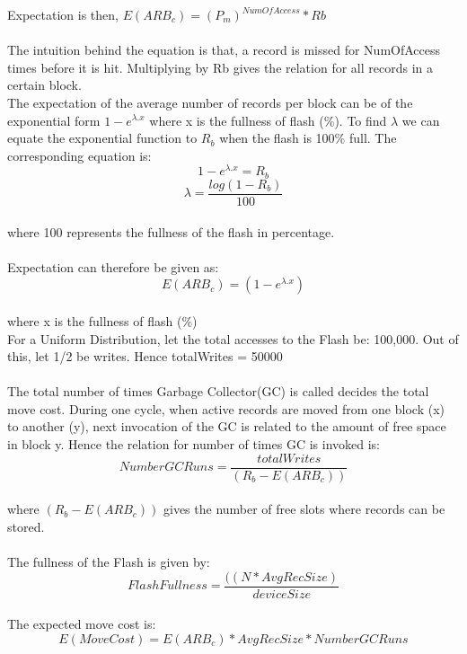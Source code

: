 Expectation is then, $E(ARB_c) = (P_m)^{NumOfAccess} * Rb$\\
\\
The intuition behind the equation is that, a record is missed for NumOfAccess times before it is hit. Multiplying by Rb gives the relation for all records in a certain block.\\


The expectation of the average number of records per block can be of the exponential form $1-e^{\lambda . x}$ where x is the fullness of flash (\%). To find $\lambda$ we can equate the exponential function to $R_b$ when the flash is 100\% full. 
The corresponding equation is:
$$1-e^{\lambda . x} = R_b$$
$$\lambda = \frac{log(1 - R_b)}{100}$$\\
where 100 represents the fullness of the flash in percentage.\\
\\
Expectation can therefore be given as: $$E(ARB_c) = (1 - e^{\lambda . x})$$\\
where x is the fullness of flash (\%)
\\

For a Uniform Distribution, let the total accesses to the Flash be: 100,000. Out of this, let 1/2 be writes. Hence totalWrites = 50000\\
\\

The total number of times  Garbage Collector(GC) is called decides the total move cost. During one cycle, when active records are moved from one block (x) to another (y), next invocation of the GC is related to the amount of free space in block y. Hence the relation for number of times GC is invoked is:\\
\begin{equation}NumberGCRuns = \frac{totalWrites}{(R_b - E(ARB_c))}\end{equation}\\
where ${(R_b - E(ARB_c))}$ gives the number of free slots where records can be stored.\\
\\

The fullness of the Flash is given by:
\begin{equation}FlashFullness = \frac{((N * AvgRecSize)}{deviceSize}\end{equation}\\

The expected move cost is:
\begin{equation}E(MoveCost) = E(ARB_c) * AvgRecSize * NumberGCRuns\end{equation}\\


